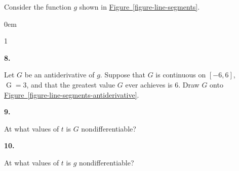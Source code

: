 \documentclass[12pt,]{book}
\theoremstyle{plain}
\theoremstyle{definition}
\numberwithin{equation}{section}
\newcounter{figstack}
\newcounter{figindex}
\newlength\fight
\newcommand\pushValignCaptionBottom[5][b]{%
\stepcounter{figstack}%
\expandafter\def\csname %
figalign\romannumeral\value{figstack}\endcsname{#1}%
\expandafter\def\csname %
figtype\romannumeral\value{figstack}\endcsname{#2}%
\expandafter\def\csname %
figwd\romannumeral\value{figstack}\endcsname{#3}%
\expandafter\def\csname %
figcontent\romannumeral\value{figstack}\endcsname{#4}%
\expandafter\def\csname %
figcap\romannumeral\value{figstack}\endcsname{#5}%
\setbox0=\hbox{%
\begin{#2}{#3}#4\end{#2}}%
\ifdim\dimexpr\ht0+\dp0\relax>\fight\global\setlength{\fight}{%
\dimexpr\ht0+\dp0\relax}\fi%
}
\newcommand\popValignCaptionBottom{%
\setcounter{figindex}{0}%
\hfill%
\whiledo{\value{figindex}<\value{figstack}}{%
\stepcounter{figindex}%
\def\tmp{\csname figwd\romannumeral\value{figindex}\endcsname}%
\begin{\csname figtype\romannumeral\value{figindex}\endcsname}[t]{\tmp}%
\centering%
\stackinset{c}{}%
{\csname figalign\romannumeral\value{figindex}\endcsname}{}%
{\csname figcontent\romannumeral\value{figindex}\endcsname}%
{\rule{0pt}{\fight}}\par%
\csname figcap\romannumeral\value{figindex}\endcsname%
\end{\csname figtype\romannumeral\value{figindex}\endcsname}%
\hfill%
}%
\setcounter{figstack}{0}%
\setlength{\fight}{0pt}%
\hfill%
}
\newenvironment{exercisegroup}%
{\medskip\noindent}%
{\par\bigskip}%
\newlength{\exercisegroupindent}%
\newlength{\exercisegroupitemwidth}%
\newenvironment{exercisegrouplist}%
{\vspace{-\partopsep}%
\begin{adjustwidth}{\exercisegroupindent}{0em}}%
{\end{adjustwidth}%
\vspace{-\partopsep}%
\vspace{\baselineskip}}%
\newenvironment{exercisegroupbycol}[1]%
{\begin{exercisegrouplist}%
\vspace{-\multicolsep}%
\begin{multicols}{#1}%
\setlength{\parindent}{0em}%
\setlength{\exercisegroupitemwidth}{\linewidth}}%
{\end{multicols}%
\vspace{-\multicolsep}%
\end{exercisegrouplist}}%
\newenvironment{exercisegroupitem}[1]%
{\begin{minipage}[t]{\exercisegroupitemwidth}
\vspace{0pt}%
{\bfseries#1}%
\rule{0pt}{\baselineskip}}{\strut%
\end{minipage}%
\hspace{\columnsep}}%
\providecommand\phantomsection{}
\newcommand{\fe}[2]{\mathop{{#1}{\left(#2\right)}}}
\newcommand{\cinterval}[2]{\left[#1,#2\right]}
\begin{document}
\begin{exercisegroup}%
Consider the function \(g\) shown in \hyperref[figure-line-segments]{Figure~\ref*{figure-line-segments}}.%
\begin{exercisegroupbycol}{1}%
\begin{exercisegroupitem}{8. }\phantomsection\hypertarget{exercise-191}{\null}
Let \(G\) be an antiderivative of \(g\).  Suppose that \(G\) is continuous on \(\cinterval{-6}{6}\), \(\fe{G}{6}=3\), and that the greatest value \(G\) ever achieves is \(6\).  Draw \(G\) onto \hyperref[figure-line-segments-antiderivative]{Figure~\ref*{figure-line-segments-antiderivative}}.%
\end{exercisegroupitem}%
\par%
\begin{exercisegroupitem}{9. }\phantomsection\hypertarget{exercise-192}{\null}
At what values of \(t\) is \(G\) nondifferentiable?%
\end{exercisegroupitem}%
\par%
\begin{exercisegroupitem}{10. }\phantomsection\hypertarget{exercise-193}{\null}
At what values of \(t\) is \(g\) nondifferentiable?%
\end{exercisegroupitem}%
\par%
\end{exercisegroupbycol}%
\end{exercisegroup}%
\end{document}
